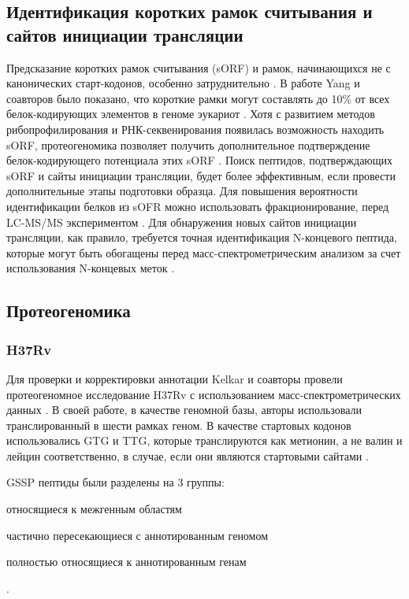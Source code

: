 \subsection{Идентификация коротких рамок считывания и сайтов инициации трансляции}
Предсказание коротких рамок считывания (sORF) и рамок, начинающихся не с канонических старт-кодонов, особенно затруднительно \cite{yang2011discovery}. В работе Yang и соавторов было показано, что короткие рамки могут составлять до 10\% от всех белок-кодирующих элементов в геноме эукариот \cite{yang2011discovery}. Хотя с развитием методов рибопрофилирования и РНК-секвенирования появилась возможность находить sORF, протеогеномика позволяет получить дополнительное подтверждение белок-кодирующего потенциала этих sORF \cite{menschaert2013deep, oyama2007diversity, slavoff2013peptidomic}. Поиск пептидов, подтверждающих sORF и сайты инициации трансляции, будет более эффективным, если провести дополнительные этапы подготовки образца. Для повышения вероятности идентификации белков из sOFR можно использовать фракционирование, перед LC-MS/MS экспериментом \cite{slavoff2013peptidomic}. Для обнаружения новых сайтов инициации трансляции, как правило, требуется точная идентификация N-концевого пептида, которые могут быть обогащены перед масс-спектрометрическим анализом за счет использования N-концевых меток \cite{hartmann2014n}. 


\subsection{Протеогеномика }
\subsubsection{ H37Rv}
Для проверки и корректировки аннотации Kelkar и соавторы провели протеогеномное исследование  H37Rv с использованием масс-спектрометрических данных \cite{kelkar2011proteogenomic}. В своей работе, в качестве геномной базы, авторы использовали транслированный в шести рамках геном. В качестве стартовых кодонов использовались GTG и TTG, которые транслируются как метионин, а не валин и лейцин соответственно, в случае, если они являются стартовыми сайтами \cite{cole1998erratum}. 

GSSP пептиды были разделены на 3 группы:
\begin{inparaenum}
    \item относящиеся к межгенным областям
    \item частично пересекающиеся с аннотированным геномом
    \item полностью относящиеся к аннотированным генам
\end{inparaenum}.

